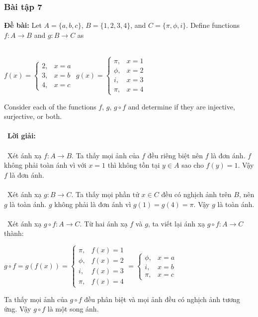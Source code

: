 \documentclass[a4paper]{article}
\begin{document}
\begin{enumerate}
\subsubsection{Bài tập 7}
\textbf{Đề bài:} Let $A = \{a, b, c\}$, $B = \{1, 2, 3, 4\}$, and $C = \{\pi, \phi, i\}$. Define functions $f : A \rightarrow B$ and $g : B \rightarrow C$ as \\\
\begin{center}
$f(x) = \begin{cases} 2, & x=a \\ 3, & x = b \\ 4, & x=c \end{cases}$ \hspace{0.5cm}
$g(x) = \begin{cases} \pi, & x=1 \\ \phi, & x = 2 \\ i, & x=3 \\ \pi, & x=4 \end{cases}$
\end{center}
Consider each of the functions $f$, $g$, $g\circ f$ and determine if they are injective, surjective, or both. \\\ \\\
\textbf{Lời giải:} \\\ \\\
Xét ánh xạ $f : A \rightarrow B$. Ta thấy mọi ảnh của $f$ đều riêng biệt nên $f$ là đơn ánh. $f$ không phải toàn ánh vì với $x = 1$ thì không tồn tại $y \in A$ sao cho $f(y) = 1$. Vậy $f$ là đơn ánh. \\\ \\\
Xét ánh xạ $g : B \rightarrow C$. Ta thấy mọi phần tử $x \in C$ đều có nghịch ảnh trên $B$, nên $g$ là toàn ánh. $g$ không phải là đơn ánh vì $g(1) = g(4) = \pi$. Vậy $g$ là toàn ánh. \\\ \\\
Xét ánh xạ $g\circ f : A \rightarrow C$.
Từ hai ánh xạ $f$ và $g$, ta viết lại ánh xạ $g\circ f : A \rightarrow C$ thành: 
\begin{center}
$g\circ f = g(f(x)) = \begin{cases} \pi, & f(x)=1 \\ \phi, & f(x) = 2 \\ i, & f(x)=3 \\ \pi, & f(x)=4 \end{cases} = \begin{cases} \phi, & x = a \\ i, & x=b \\ \pi, & x=c \end{cases}$
\end{center}
Ta thấy mọi ảnh của $g \circ f$ đều phân biệt và mọi ảnh đều có nghịch ảnh tương ứng. Vậy $g \circ f$ là một song ánh.
\clearpage

\end{enumerate}
\end{document}
